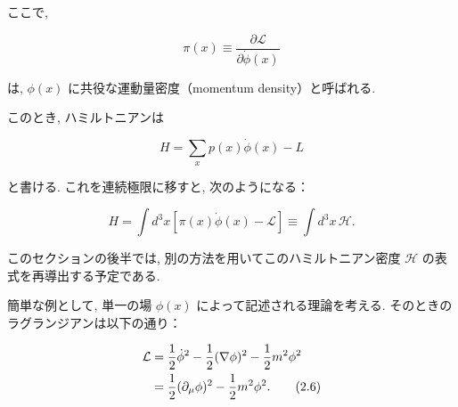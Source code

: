 \documentclass[a4paper,12pt]{article}
\begin{document}
ここで,

\begin{equation}
    \pi(x) \equiv \frac{\partial \mathcal{L}}{\partial \dot{\phi}(x)} \tag{2.4}
\end{equation}

は, $\phi(x)$ に共役な運動量密度（momentum density）と呼ばれる.

このとき, ハミルトニアンは

\begin{equation}
    H = \sum_x p(x) \dot{\phi}(x) - L
\end{equation}

と書ける. これを連続極限に移すと, 次のようになる：

\begin{equation}
    H = \int d^3x \left[ \pi(x) \dot{\phi}(x) - \mathcal{L} \right] 
    \equiv \int d^3x\, \mathcal{H}. \tag{2.5}
\end{equation}

このセクションの後半では, 別の方法を用いてこのハミルトニアン密度 $\mathcal{H}$ の表式を再導出する予定である.

簡単な例として, 単一の場 $\phi(x)$ によって記述される理論を考える. そのときのラグランジアンは以下の通り：

\begin{align}
    \mathcal{L} &= \frac{1}{2} \dot{\phi}^2 - \frac{1}{2} (\nabla \phi)^2 - \frac{1}{2} m^2 \phi^2 \notag \\
    &= \frac{1}{2} (\partial_\mu \phi)^2 - \frac{1}{2} m^2 \phi^2. \tag{2.6}
\end{align}
\end{document}
